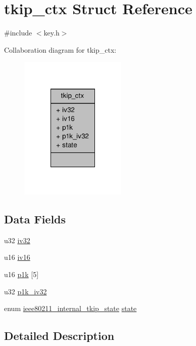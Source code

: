 \hypertarget{structtkip__ctx}{\section{tkip\-\_\-ctx Struct Reference}
\label{structtkip__ctx}
}


{\ttfamily \#include $<$key.\-h$>$}



Collaboration diagram for tkip\-\_\-ctx\-:
\nopagebreak
\begin{figure}[H]
\begin{center}
\leavevmode
\includegraphics[width=144pt]{structtkip__ctx__coll__graph}
\end{center}
\end{figure}
\subsection*{Data Fields}
\begin{DoxyCompactItemize}
\item 
u32 \hyperlink{structtkip__ctx_a8dcfea175d62065bce779b4c72f7aeaf}{iv32}
\item 
u16 \hyperlink{structtkip__ctx_aa895c0235826b5239fe3fc9e60234f7a}{iv16}
\item 
u16 \hyperlink{structtkip__ctx_abce48d931850e3d4a10223b34f9edf7b}{p1k} \mbox{[}5\mbox{]}
\item 
u32 \hyperlink{structtkip__ctx_a8836e079a29312e72713be0756c36f7d}{p1k\-\_\-iv32}
\item 
enum \hyperlink{key_8h_a0e2583d6ee1352416a3a5e3e9d905639}{ieee80211\-\_\-internal\-\_\-tkip\-\_\-state} \hyperlink{structtkip__ctx_aa20c2a9452e9ce568def7cce7ca256b3}{state}
\end{DoxyCompactItemize}


\subsection{Detailed Description}


